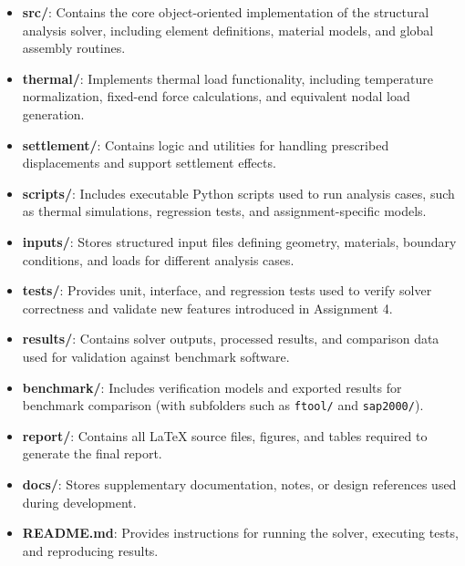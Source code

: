 \begin{itemize}
    \item \textbf{src/}: Contains the core object-oriented implementation of the
    structural analysis solver, including element definitions, material models,
    and global assembly routines.

    \item \textbf{thermal/}: Implements thermal load functionality, including
    temperature normalization, fixed-end force calculations, and equivalent
    nodal load generation.

    \item \textbf{settlement/}: Contains logic and utilities for handling
    prescribed displacements and support settlement effects.

    \item \textbf{scripts/}: Includes executable Python scripts used to run
    analysis cases, such as thermal simulations, regression tests, and
    assignment-specific models.

    \item \textbf{inputs/}: Stores structured input files defining geometry,
    materials, boundary conditions, and loads for different analysis cases.

    \item \textbf{tests/}: Provides unit, interface, and regression tests used
    to verify solver correctness and validate new features introduced in
    Assignment 4.

    \item \textbf{results/}: Contains solver outputs, processed results, and
    comparison data used for validation against benchmark software.

    \item \textbf{benchmark/}: Includes verification models and exported results
    for benchmark comparison (with subfolders such as \texttt{ftool/} and
    \texttt{sap2000/}).

    \item \textbf{report/}: Contains all LaTeX source files, figures, and tables
    required to generate the final report.

    \item \textbf{docs/}: Stores supplementary documentation, notes, or design
    references used during development.

    \item \textbf{README.md}: Provides instructions for running the solver,
    executing tests, and reproducing results.
\end{itemize}
